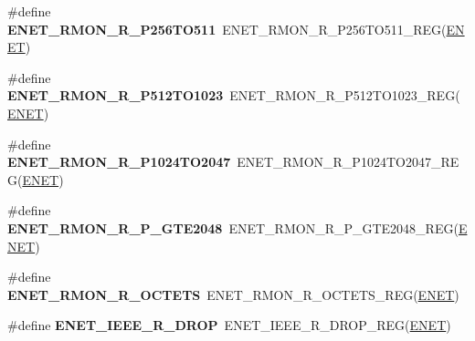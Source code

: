 \begin{DoxyCompactItemize}
\item 
\#define {\bfseries E\+N\+E\+T\+\_\+\+R\+M\+O\+N\+\_\+\+R\+\_\+\+P256\+T\+O511}~E\+N\+E\+T\+\_\+\+R\+M\+O\+N\+\_\+\+R\+\_\+\+P256\+T\+O511\+\_\+\+R\+EG(\hyperlink{group__ENET__Peripheral__Access__Layer_ga4745105f505f3ab949d6a57fbe2a0ed5}{E\+N\+ET})\hypertarget{group__ENET__Register__Accessor__Macros_ga42a4dce30341d5f9b2e76f53c27638c8}{}\label{group__ENET__Register__Accessor__Macros_ga42a4dce30341d5f9b2e76f53c27638c8}

\item 
\#define {\bfseries E\+N\+E\+T\+\_\+\+R\+M\+O\+N\+\_\+\+R\+\_\+\+P512\+T\+O1023}~E\+N\+E\+T\+\_\+\+R\+M\+O\+N\+\_\+\+R\+\_\+\+P512\+T\+O1023\+\_\+\+R\+EG(\hyperlink{group__ENET__Peripheral__Access__Layer_ga4745105f505f3ab949d6a57fbe2a0ed5}{E\+N\+ET})\hypertarget{group__ENET__Register__Accessor__Macros_ga9c05f6cd159acd6a4c5d0b36b8a41252}{}\label{group__ENET__Register__Accessor__Macros_ga9c05f6cd159acd6a4c5d0b36b8a41252}

\item 
\#define {\bfseries E\+N\+E\+T\+\_\+\+R\+M\+O\+N\+\_\+\+R\+\_\+\+P1024\+T\+O2047}~E\+N\+E\+T\+\_\+\+R\+M\+O\+N\+\_\+\+R\+\_\+\+P1024\+T\+O2047\+\_\+\+R\+EG(\hyperlink{group__ENET__Peripheral__Access__Layer_ga4745105f505f3ab949d6a57fbe2a0ed5}{E\+N\+ET})\hypertarget{group__ENET__Register__Accessor__Macros_ga99cd39d027b2229cca4fccb4a632c18e}{}\label{group__ENET__Register__Accessor__Macros_ga99cd39d027b2229cca4fccb4a632c18e}

\item 
\#define {\bfseries E\+N\+E\+T\+\_\+\+R\+M\+O\+N\+\_\+\+R\+\_\+\+P\+\_\+\+G\+T\+E2048}~E\+N\+E\+T\+\_\+\+R\+M\+O\+N\+\_\+\+R\+\_\+\+P\+\_\+\+G\+T\+E2048\+\_\+\+R\+EG(\hyperlink{group__ENET__Peripheral__Access__Layer_ga4745105f505f3ab949d6a57fbe2a0ed5}{E\+N\+ET})\hypertarget{group__ENET__Register__Accessor__Macros_ga56a77b358a36b49a431e33c3c08b95a8}{}\label{group__ENET__Register__Accessor__Macros_ga56a77b358a36b49a431e33c3c08b95a8}

\item 
\#define {\bfseries E\+N\+E\+T\+\_\+\+R\+M\+O\+N\+\_\+\+R\+\_\+\+O\+C\+T\+E\+TS}~E\+N\+E\+T\+\_\+\+R\+M\+O\+N\+\_\+\+R\+\_\+\+O\+C\+T\+E\+T\+S\+\_\+\+R\+EG(\hyperlink{group__ENET__Peripheral__Access__Layer_ga4745105f505f3ab949d6a57fbe2a0ed5}{E\+N\+ET})\hypertarget{group__ENET__Register__Accessor__Macros_gafcac9c606ebecf297e008fa0a7079327}{}\label{group__ENET__Register__Accessor__Macros_gafcac9c606ebecf297e008fa0a7079327}

\item 
\#define {\bfseries E\+N\+E\+T\+\_\+\+I\+E\+E\+E\+\_\+\+R\+\_\+\+D\+R\+OP}~E\+N\+E\+T\+\_\+\+I\+E\+E\+E\+\_\+\+R\+\_\+\+D\+R\+O\+P\+\_\+\+R\+EG(\hyperlink{group__ENET__Peripheral__Access__Layer_ga4745105f505f3ab949d6a57fbe2a0ed5}{E\+N\+ET})\hypertarget{group__ENET__Register__Accessor__Macros_gaccf89cd15d247486412191b1af3f77c3}{}\label{group__ENET__Register__Accessor__Macros_gaccf89cd15d247486412191b1af3f77c3}


\end{DoxyCompactItemize}
